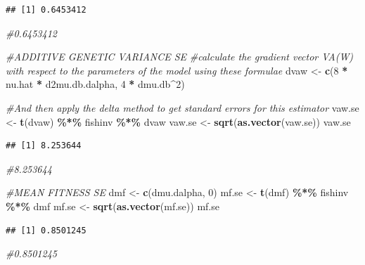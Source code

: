 \documentclass[
]{article}
\newenvironment{Shaded}{\begin{snugshade}}{\end{snugshade}}
\newcommand{\CommentTok}[1]{\textcolor[rgb]{0.56,0.35,0.01}{\textit{#1}}}
\newcommand{\DecValTok}[1]{\textcolor[rgb]{0.00,0.00,0.81}{#1}}
\newcommand{\FunctionTok}[1]{\textcolor[rgb]{0.13,0.29,0.53}{\textbf{#1}}}
\newcommand{\NormalTok}[1]{#1}
\newcommand{\OtherTok}[1]{\textcolor[rgb]{0.56,0.35,0.01}{#1}}
\newcommand{\SpecialCharTok}[1]{\textcolor[rgb]{0.81,0.36,0.00}{\textbf{#1}}}
\begin{document}
\begin{verbatim}
## [1] 0.6453412
\end{verbatim}

\begin{Shaded}
\begin{Highlighting}[]
\CommentTok{\#0.6453412}

\CommentTok{\#ADDITIVE GENETIC VARIANCE SE }
\CommentTok{\#calculate the gradient vector VA(W) with respect to the parameters of the model using these formulae}
\NormalTok{dvaw }\OtherTok{\textless{}{-}} \FunctionTok{c}\NormalTok{(}\DecValTok{8} \SpecialCharTok{*}\NormalTok{ nu.hat }\SpecialCharTok{*}\NormalTok{ d2mu.db.dalpha, }\DecValTok{4} \SpecialCharTok{*}\NormalTok{ dmu.db}\SpecialCharTok{\^{}}\DecValTok{2}\NormalTok{)}

\CommentTok{\#And then apply the delta method to get standard errors for this estimator}
\NormalTok{vaw.se }\OtherTok{\textless{}{-}} \FunctionTok{t}\NormalTok{(dvaw) }\SpecialCharTok{\%*\%}\NormalTok{ fishinv }\SpecialCharTok{\%*\%}\NormalTok{ dvaw}
\NormalTok{vaw.se }\OtherTok{\textless{}{-}} \FunctionTok{sqrt}\NormalTok{(}\FunctionTok{as.vector}\NormalTok{(vaw.se))}
\NormalTok{vaw.se}
\end{Highlighting}
\end{Shaded}

\begin{verbatim}
## [1] 8.253644
\end{verbatim}

\begin{Shaded}
\begin{Highlighting}[]
\CommentTok{\#8.253644}

\CommentTok{\#MEAN FITNESS SE}
\NormalTok{dmf }\OtherTok{\textless{}{-}} \FunctionTok{c}\NormalTok{(dmu.dalpha, }\DecValTok{0}\NormalTok{)}
\NormalTok{mf.se }\OtherTok{\textless{}{-}} \FunctionTok{t}\NormalTok{(dmf) }\SpecialCharTok{\%*\%}\NormalTok{ fishinv }\SpecialCharTok{\%*\%}\NormalTok{ dmf}
\NormalTok{mf.se }\OtherTok{\textless{}{-}} \FunctionTok{sqrt}\NormalTok{(}\FunctionTok{as.vector}\NormalTok{(mf.se))}
\NormalTok{mf.se}
\end{Highlighting}
\end{Shaded}

\begin{verbatim}
## [1] 0.8501245
\end{verbatim}

\begin{Shaded}
\begin{Highlighting}[]
\CommentTok{\#0.8501245}
\end{Highlighting}
\end{Shaded}
\end{document}
